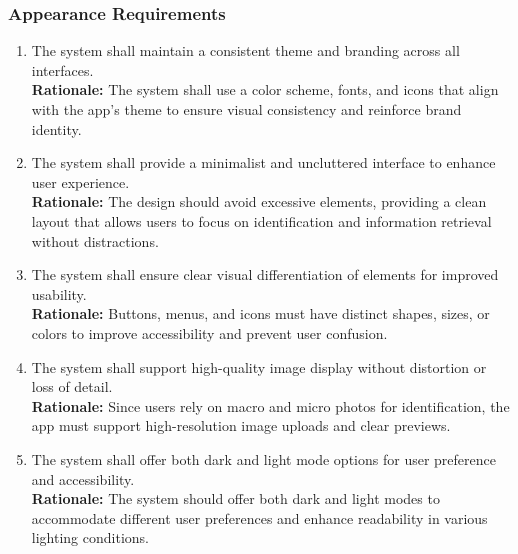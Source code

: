 \documentclass[]{article}
\begin{document}
\subsubsection{Appearance Requirements}
\label{ssub:appearance_requirements}
\begin{enumerate}[{LF-A}1. ]
	\item The system shall maintain a consistent theme and branding across all interfaces.\\
	\textbf{Rationale:} The system shall use a color scheme, fonts, and icons that align with the app’s theme to ensure visual consistency and reinforce brand identity.
	\item The system shall provide a minimalist and uncluttered interface to enhance user experience.\\
	\textbf{Rationale:} The design should avoid excessive elements, providing a clean layout that allows users to focus on identification and information retrieval without distractions.
	\item The system shall ensure clear visual differentiation of elements for improved usability.\\
	\textbf{Rationale:} Buttons, menus, and icons must have distinct shapes, sizes, or colors to improve accessibility and prevent user confusion.
	\item The system shall support high-quality image display without distortion or loss of detail.\\
	\textbf{Rationale:} Since users rely on macro and micro photos for identification, the app must support high-resolution image uploads and clear previews.
	\item The system shall offer both dark and light mode options for user preference and accessibility.\\
	\textbf{Rationale:} The system should offer both dark and light modes to accommodate different user preferences and enhance readability in various lighting conditions.
\end{enumerate}
\end{document}
